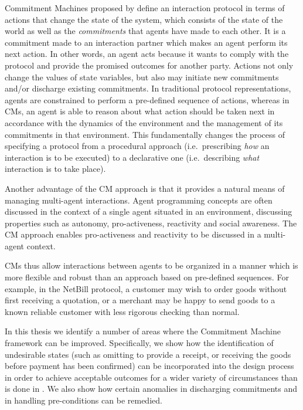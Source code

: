 \documentclass[11pt,a4paper,twoside]{article}
\begin{document}
Commitment Machines proposed by \cite{mi:article:dunham} define an
interaction protocol in terms of actions that change the state of the system,
which consists of the state of the world as well as the {\it commitments} that
agents have made to each other. It is a commitment made to an interaction
partner which makes an agent perform its next action. In other words, an agent
acts because it wants to comply with the protocol and provide the promised
outcomes for another party. Actions not only change the values of state
variables, but also may initiate new commitments and/or discharge existing
commitments. In traditional protocol representations, agents are constrained to
perform a pre-defined sequence of actions, whereas in CMs, an agent is able to
reason about what action should be taken next in accordance with the dynamics of
the environment and the management of its commitments in that environment.  This
fundamentally changes the process of specifying a protocol from a procedural
approach (i.e.\ prescribing {\em how} an interaction is to be executed) to a
declarative one (i.e.\ describing {\em what} interaction is to take place).

Another advantage of the CM approach is that it provides a natural means of
managing multi-agent interactions. Agent programming concepts are often
discussed in the context of a single agent situated in an environment,
discussing properties such as autonomy, pro-activeness, reactivity and social
awareness. The CM approach enables pro-activeness and reactivity to be discussed
in a multi-agent context.

CMs thus allow interactions between agents to be organized in a manner which is
more flexible and robust than an approach based on pre-defined sequences. For
example, in the NetBill protocol, a
customer may wish to order goods without first receiving a quotation, or a
merchant may be happy to send goods to a known reliable customer with less
rigorous checking than normal.

In this thesis we identify a number of areas where the Commitment Machine
framework can be improved.  Specifically, we show how the identification of
undesirable states (such as omitting to provide a receipt, or receiving the
goods before payment has been confirmed) can be incorporated into the design
process in order to achieve acceptable outcomes for a wider variety of
circumstances than is done in \citep{mi:handbook03,mi:article:dunham}. 
We also show how certain
anomalies in discharging commitments and in handling pre-conditions can be
remedied. 
\end{document}
